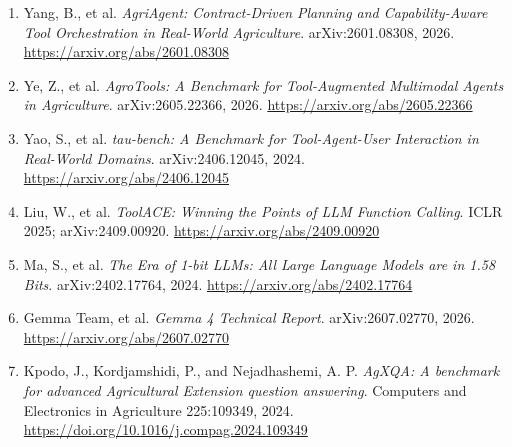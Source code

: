 \documentclass[14pt,a4paper]{extarticle}
\begin{document}
\begin{enumerate}
\item Yang, B., et al. \emph{AgriAgent: Contract-Driven Planning and Capability-Aware Tool Orchestration in Real-World Agriculture}. arXiv:2601.08308, 2026. \url{https://arxiv.org/abs/2601.08308}
\item Ye, Z., et al. \emph{AgroTools: A Benchmark for Tool-Augmented Multimodal Agents in Agriculture}. arXiv:2605.22366, 2026. \url{https://arxiv.org/abs/2605.22366}
\item Yao, S., et al. \emph{tau-bench: A Benchmark for Tool-Agent-User Interaction in Real-World Domains}. arXiv:2406.12045, 2024. \url{https://arxiv.org/abs/2406.12045}
\item Liu, W., et al. \emph{ToolACE: Winning the Points of LLM Function Calling}. ICLR 2025; arXiv:2409.00920. \url{https://arxiv.org/abs/2409.00920}
\item Ma, S., et al. \emph{The Era of 1-bit LLMs: All Large Language Models are in 1.58 Bits}. arXiv:2402.17764, 2024. \url{https://arxiv.org/abs/2402.17764}
\item Gemma Team, et al. \emph{Gemma 4 Technical Report}. arXiv:2607.02770, 2026. \url{https://arxiv.org/abs/2607.02770}
\item Kpodo, J., Kordjamshidi, P., and Nejadhashemi, A. P. \emph{AgXQA: A benchmark for advanced Agricultural Extension question answering}. Computers and Electronics in Agriculture 225:109349, 2024. \url{https://doi.org/10.1016/j.compag.2024.109349}
\end{enumerate}\endgroup
\end{document}
